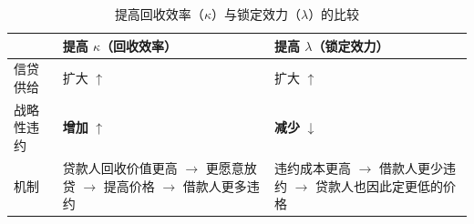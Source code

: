 \begin{table}[htbp]
  \centering
  \caption{提高回收效率（$\kappa$）与锁定效力（$\lambda$）的比较}
  \label{tab:kappa_vs_lambda}
  \begin{tabular}{l p{5cm} p{5cm}}
    \toprule
    & \textbf{提高 $\kappa$（回收效率）} & \textbf{提高 $\lambda$（锁定效力）} \\
    \midrule
    信贷供给 & 扩大 $\uparrow$ & 扩大 $\uparrow$ \\
    \addlinespace %
    战略性违约 & \textbf{增加} $\uparrow$ & \textbf{减少} $\downarrow$ \\
    \addlinespace
    机制 & 贷款人回收价值更高 $\rightarrow$ \newline 更愿意放贷 $\rightarrow$ \newline 提高价格 $\rightarrow$ \newline 借款人更多违约 
         & 违约成本更高 $\rightarrow$ \newline 借款人更少违约 $\rightarrow$ \newline 贷款人也因此定更低的价格 \\
    \bottomrule
  \end{tabular}
\end{table}